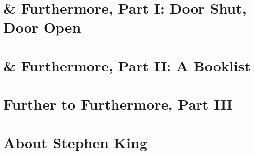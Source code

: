 \documentclass{article}
\numberwithin{equation}{section}
\begin{document}

\section{\& Furthermore, Part I: Door Shut, Door Open}


\section{\& Furthermore, Part II: A Booklist}


\section{Further to Furthermore, Part III}


\section{About Stephen King}


\printbibliography[heading=bibintoc]
	
\end{document}
